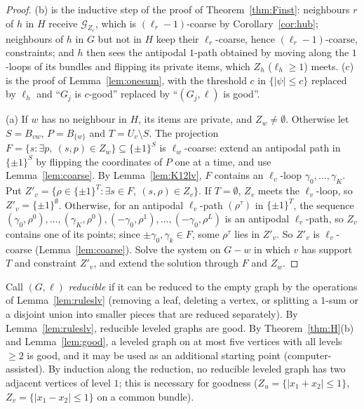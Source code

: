\documentclass[11pt,letterpaper]{article}
\theoremstyle{definition}
\newcommand{\cG}{\mathcal{G}}
\newcommand{\cube}[1]{\{\pm1\}^{#1}}
\begin{document}
\begin{proof}
(b) is the inductive step of the proof of Theorem~\ref{thm:Finst}: neighbours $r$ of $h$ in $H$
receive $\cG_{Z_r}$, which is $(\ell_r-1)$-coarse by Corollary~\ref{cor:hub}; neighbours of $h$ in $G$
but not in $H$ keep their $\ell_r$-coarse, hence $(\ell_r-1)$-coarse, constraints; and $h$ then sees
the antipodal $1$-path obtained by moving along the $1$-loops of its bundles and flipping its private
items, which $Z_h$ ($\ell_h\ge1$) meets. (c) is the proof of Lemma~\ref{lem:onesum}, with the
threshold $c$ in $\{|\psi|\le c\}$ replaced by $\ell_h$ and ``$G_j$ is $c$-good'' replaced by
``$(G_j,\ell)$ is good''.

(a) If $w$ has no neighbour in $H$, its items are private, and $Z_w\ne\emptyset$. Otherwise let
$S=B_{vw}$, $P=B_{\{w\}}$ and $T=U_v\setminus S$. The projection
$F=\{s:\exists p,\ (s,p)\in Z_w\}\subseteq\cube S$ is $\ell_w$-coarse: extend an antipodal path in
$\cube S$ by flipping the coordinates of $P$ one at a time, and use Lemma~\ref{lem:coarse}. By
Lemma~\ref{lem:K12lv}, $F$ contains an $\ell_v$-loop $\gamma_0,\dots,\gamma_K$. Put
$Z'_v=\{\rho\in\cube T:\exists s\in F,\ (s,\rho)\in Z_v\}$. If $T=\emptyset$, $Z_v$ meets the
$\ell_v$-loop, so $Z'_v=\cube\emptyset$. Otherwise, for an antipodal $\ell_v$-path $(\rho^\tau)$ in
$\cube T$, the sequence $(\gamma_0,\rho^0),\dots,(\gamma_K,\rho^0),(-\gamma_0,\rho^1),\dots,
(-\gamma_0,\rho^L)$ is an antipodal $\ell_v$-path, so $Z_v$ contains one of its points; since
$\pm\gamma_0,\gamma_k\in F$, some $\rho^\tau$ lies in $Z'_v$. So $Z'_v$ is $\ell_v$-coarse
(Lemma~\ref{lem:coarse}). Solve the system on $G-w$ in which $v$ has support $T$ and constraint
$Z'_v$, and extend the solution through $F$ and $Z_w$.
\end{proof}

Call $(G,\ell)$ \emph{reducible} if it can be reduced to the empty graph by the operations of
Lemma~\ref{lem:ruleslv} (removing a leaf, deleting a vertex, or splitting a $1$-sum or a disjoint
union into smaller pieces that are reduced separately). By Lemma~\ref{lem:ruleslv}, reducible leveled
graphs are good. By Theorem~\ref{thm:H}(b) and Lemma~\ref{lem:good}, a leveled graph on at most five
vertices with all levels $\ge2$ is good, and it may be used as an additional starting point
(computer-assisted). By induction along the reduction, no reducible leveled graph has two adjacent
vertices of level $1$; this is necessary for goodness ($Z_u=\{|x_1+x_2|\le1\}$, $Z_v=\{|x_1-x_2|\le1\}$ on a common bundle).
\end{document}
